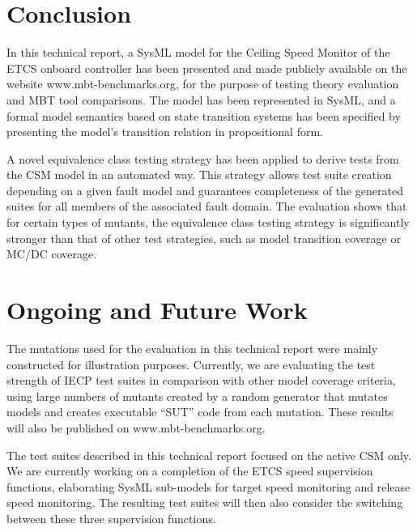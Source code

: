 \section{Conclusion}\label{sec:conc}

 

In this technical report, 
a SysML model for the Ceiling Speed Monitor of the ETCS onboard controller 
has been presented and made publicly available on the website www.mbt-benchmarks.org, for the purpose 
of testing theory evaluation and MBT tool comparisons. 
The model has been represented in SysML, and a formal model semantics based on state transition systems has been specified by presenting the model's transition relation in propositional form.


A novel equivalence class testing strategy 
has been applied to derive tests from the CSM model in an automated way. This strategy allows 
test suite creation depending on a given fault model and guarantees completeness of the generated suites for all members of the associated fault domain. The evaluation shows that for certain types of mutants, the equivalence class testing strategy  is significantly stronger than that of other
test strategies, such as model transition coverage or MC/DC coverage.




\section{Ongoing and Future Work}\label{sec:futurework}

The mutations used for the evaluation in this technical report were mainly constructed for illustration purposes.
Currently, we are evaluating the test strength of IECP test suites in comparison with  other model coverage criteria, using large numbers of mutants created by a random generator that mutates models and creates executable ``SUT'' code from each mutation.
These results will also be published on www.mbt-benchmarks.org.

The test suites described in this technical report focused on the active CSM only. We are currently working on a completion of the ETCS speed supervision functions, elaborating SysML sub-models for target speed monitoring and release speed monitoring. The resulting test suites will then also consider the switching between these three supervision functions.

